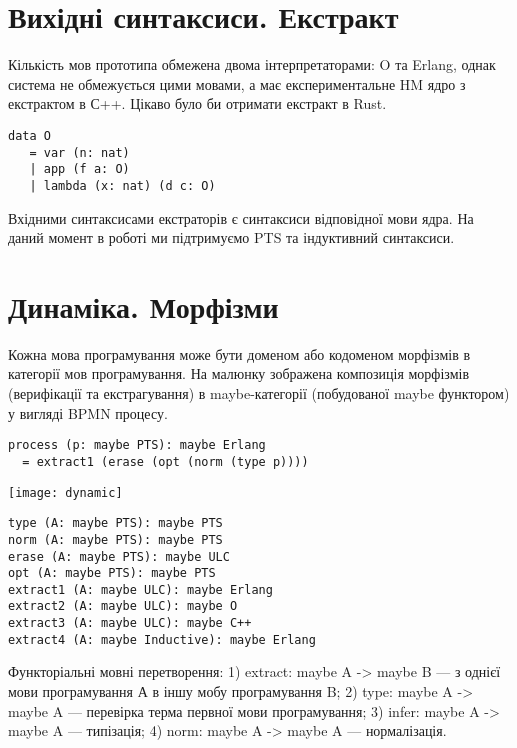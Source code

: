 \section{Вихідні синтаксиси. Екстракт}
Кількість мов прототипа обмежена двома інтерпретаторами: O та Erlang,
однак система не обмежується цими мовами, а має експериментальне HM ядро
з екстрактом в С++. Цікаво було би отримати екстракт в Rust.

\begin{lstlisting}[mathescape=true]
data O
   = var (n: nat)
   | app (f a: O)
   | lambda (x: nat) (d c: O)
\end{lstlisting}

Вхідними синтаксисами екстраторів є синтаксиси відповідної мови ядра.
На даний момент в роботі ми підтримуємо PTS та індуктивний синтаксиси.

\section{Динаміка. Морфізми}

Кожна мова програмування може бути доменом або кодоменом
морфізмів в категорії мов програмування. На малюнку зображена
композиція морфізмів (верифікації та екстрагування)
в maybe-категорії (побудованої maybe функтором) у вигляді BPMN процесу.

\begin{lstlisting}[mathescape=true]
process (p: maybe PTS): maybe Erlang
  = extract1 (erase (opt (norm (type p))))
\end{lstlisting}

\texttt{[image: dynamic]}

\begin{lstlisting}[mathescape=true]
type (A: maybe PTS): maybe PTS
norm (A: maybe PTS): maybe PTS
erase (A: maybe PTS): maybe ULC
opt (A: maybe PTS): maybe PTS
extract1 (A: maybe ULC): maybe Erlang
extract2 (A: maybe ULC): maybe O
extract3 (A: maybe ULC): maybe C++
extract4 (A: maybe Inductive): maybe Erlang
\end{lstlisting}

Функторіальні мовні перетворення: 1) extract: maybe A -> maybe B --- з однієї
мови програмування А в іншу мобу програмування B; 2) type: maybe A -> maybe A
--- перевірка терма первної мови програмування; 3) infer: maybe A -> maybe A
--- типізація; 4) norm: maybe A -> maybe A --- нормалізація.


